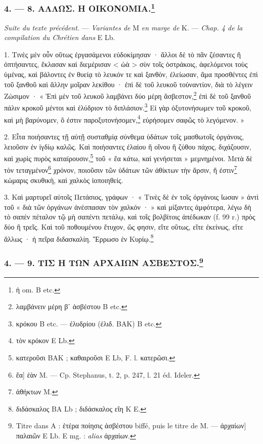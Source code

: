 \documentclass[a4paper, 11pt, oneside, polutonikogreek, french]{article}
\begin{document}
\bigskip
\centerline{\EightStarTaper}
\centerline{\EightStarTaper\EightStarTaper}
\bigskip

\subsubsection[4. --- 8. ΑΛΛΩΣ. Η ΟΙΚΟΝΟΜΙΑ.]{4. --- 8. ΑΛΛΩΣ. Η ΟΙΚΟΝΟΜΙΑ.\footnote{ἡ om. B etc.}}

\emph{Suite du texte précédent.} --- \emph{Variantes de} M \emph{en marge de} K. --- \emph{Chap. 4 de la compilation du Chrétien dans} E Lb.

\bigskip

1. Τινὲς μὲν οὖν οὕτως ἐργασάμενοι εὐδοκίμησαν · ἄλλοι δὲ τὸ πᾶν ζέσαντες ἢ ὀπτήσαντες, ἔκλασαν καὶ διεμέρισαν < ὡὰ > σὺν τοῖς ὀστράκοις, ἀφελόμενοι τοὺς ὑμένας, καὶ βάλοντες ἐν θυείᾳ τὸ λευκόν τε καὶ ξανθὸν, ἐλείωσαν, ἅμα προσθέντες ἐπὶ τοῦ ξανθοῦ καὶ ἄλλην μοῖραν λεκίθου · ἐπὶ δὲ τοῦ λευκοῦ τοὐναντίον, διὰ τὸ λέγειν Ζώσιμον · « Ἐπὶ μὲν τοῦ λευκοῦ λαμβάνει δύο μέρη ἄσβεστον,\footnote{λαμβάνειν μέρη βʹ ἀσβέστου B etc.} ἐπὶ δὲ τοῦ ξανθοῦ πάλιν κροκοῦ μέντοι καὶ ἐλύδριον τὸ διπλάσιον.\footnote{κρόκου B etc. --- ἐλυδρίου (ἐλιδ. BAK) B etc.} Εἰ γὰρ ὀξυτονήσωμεν τοῦ κροκοῦ, καὶ μὴ βαρύνομεν, ὅ ἐστιν παροξυτονήσομεν,\footnote{τὸν κρόκον E Lb.} εὑρήσομεν σαφῶς τὸ λεγόμενον. »

2. Εἶτα ποιήσαντες τῇ αὐτῇ συσταθμίᾳ σύνθεμα ὑδάτων τοῖς μασθωτοῖς ὀργάνοις, λειοῦσιν ἐν ἰγδίῳ καλῶς. Καὶ ποιήσαντες ἐλαίου ἢ οἴνου ἢ ζύθου πάχος, διχάζουσιν, καὶ χωρὶς πυρὸς καταίρουσιν,\footnote{κατεροῦσι BAK ; καθαιροῦσι E Lb, F. l. κατερῶσι.} τοῦ « ἔα κάτω, καὶ γενήσεται » μεμνημένοι. Μετὰ δὲ τὸν τεταγμένον\footnote{ἔα] ἐὰν M. --- Cp. Stephanus, t. 2, p. 247, l. 21 éd. Ideler.} χρόνον, ποιοῦσιν τῶν ὑδάτων τῶν ἀθίκτων τὴν ἄρσιν, ἥ ἐστιν\footnote{ἀθήκτων M.} κώμαρις σκυθικὴ, καὶ χαλκὸς ἰοποιηθείς.

3. Καὶ μαρτυρεῖ αὐτοῖς Πετάσιος, γράφων · « Τινὲς δὲ ἐν τοῖς ὀργάνοις ἴωσαν » ἀντὶ τοῦ « διὰ τῶν ὀργάνων ἀνέσπασαν τὸν χαλκόν · » καὶ μίξαντες ἀμφότερα, λέγω δὴ τὸ σαπὲν πέταλον τῷ μὴ σαπέντι πετάλῳ, καὶ τοῖς βολβίτοις ἀπέδωκαν (f. 99 r.) πρὸς δύο ἢ τρεῖς. Καὶ τοῦ ποθουμένου ἔτυχον, ὥς φησιν, εἴτε οὕτως, εἴτε ἐκείνως, εἴτε ἄλλως · ἡ πεῖρα διδασκαλίη. Ἔρρωσο ἐν Κυρίῳ.\footnote{διδάσκαλος BA Lb ; διδάσκαλος εἴη K E.}

\bigskip
\centerline{\EightStarTaper}
\centerline{\EightStarTaper\EightStarTaper}
\bigskip

\subsubsection[4. --- 9. ΤΙΣ Η ΤΩΝ ΑΡΧΑΙΩΝ ΑΣΒΕΣΤΟΣ.]{4. --- 9. ΤΙΣ Η ΤΩΝ ΑΡΧΑΙΩΝ ΑΣΒΕΣΤΟΣ.\footnote{Titre dans A : ἑτέρα ποίησις ἀσβέστου biffé, puis le titre de M. --- ἀρχαίων] παλαιῶν E Lb. E mg. : \emph{alias} ἀρχαίων.}}
\end{document}
